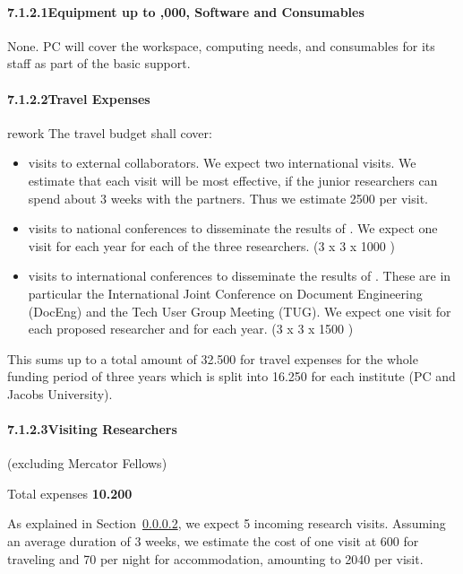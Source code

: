 \paragraph{7.1.2.1\quad Equipment up to ,000, Software and Consumables}

None.  PC will cover the workspace, computing needs, and consumables for its staff as part
of the basic support.

\paragraph{7.1.2.2\quad Travel Expenses}
\label{sec:travel}

\begin{oldpart}{rework}
  The travel budget shall cover:
  \begin{itemize}
  \item visits to external collaborators. We expect two international visits. We estimate
    that each visit will be most effective, if the junior researchers can spend about 3
    weeks with the partners. Thus we estimate 2500 {\texteuro} per visit.
  \item visits to national conferences to disseminate the results of {\pn}. We expect
    one visit for each year for each of the three researchers. (3 x 3 x 1000 {\texteuro})
  \item visits to international conferences to disseminate the results of {\pn}. These
    are in particular the International Joint Conference on Document Engineering (DocEng)
    and the Tech User Group Meeting (TUG). We expect one visit for each proposed
    researcher and for each year. (3 x 3 x 1500 {\texteuro})
  \end{itemize}

  This sums up to a total amount of 32.500 {\texteuro} for travel expenses for the whole
  funding period of three years which is split into 16.250 {\texteuro} for each institute
  (PC and Jacobs University).
\end{oldpart}

\paragraph{7.1.2.3\quad Visiting Researchers} (excluding Mercator Fellows)
\label{sec:funds:visiting}

Total expenses \textbf{10.200 \texteuro}
\medskip

As explained in Section~\ref{sec:travel}, we expect 5 incoming research visits.  Assuming
an average duration of 3 weeks, we estimate the cost of one visit at 600 {\texteuro} for
traveling and 70 {\texteuro} per night for accommodation, amounting to 2040 \texteuro per
visit.


